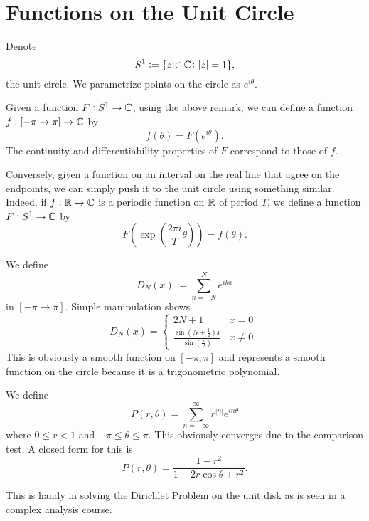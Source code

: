 \section{Functions on the Unit Circle}
Denote
\begin{equation*}
    S^1 := \{z\in\mathbb{C}\colon|z| = 1\},
\end{equation*}
the unit circle. We parametrize points on the circle as $e^{i\theta}$. 

Given a function $F: S^1\to\mathbb{C}$, using the above remark, we can define a function $f: [-\pi\to\pi]\to\mathbb{C}$ by 
\begin{equation*}
    f(\theta) = F(e^{i\theta}).
\end{equation*}
The continuity and differentiability properties of $F$ correspond to those of $f$.

Conversely, given a function on an interval on the real line that agree on the endpoints, we can simply push it to the unit circle using something similar. Indeed, if $f:\mathbb{R}\to\mathbb{C}$ is a periodic function on $\mathbb{R}$ of period $T$, we define a function $F: S^1\to\mathbb{C}$ by 
\begin{equation*}
    F\left(\exp\left(\frac{2\pi i}{T}\theta\right)\right) = f(\theta).
\end{equation*}

\begin{example}
    We define 
    \begin{equation*}
        D_N(x) := \sum_{n = -N}^N e^{ikx}
    \end{equation*}
    in $[-\pi\to\pi]$. Simple manipulation shows 
    \begin{equation*}
        D_N(x) = 
        \begin{cases}
            2N + 1 & x = 0\\
            \frac{\sin\left(N + \frac{1}{2}\right)x}{\sin\left(\frac{x}{2}\right)} & x\ne 0.
        \end{cases}
    \end{equation*}
    This is obviously a smooth function on $[-\pi,\pi]$ and represents a smooth function on the circle because it is a trigonometric polynomial.
\end{example}

\begin{example}
    We define 
    \begin{equation*}
        P(r,\theta) = \sum_{n = -\infty}^\infty r^{|n|}e^{in\theta}
    \end{equation*}
    where $0\le r < 1$ and $-\pi\le\theta\le\pi$. This obviously converges due to the comparison test. A closed form for this is 
    \begin{equation*}
        P(r,\theta) = \frac{1 - r^2}{1 - 2r\cos\theta + r^2}.
    \end{equation*}

    This is handy in solving the Dirichlet Problem on the unit disk as is seen in a complex analysis course.
\end{example}

